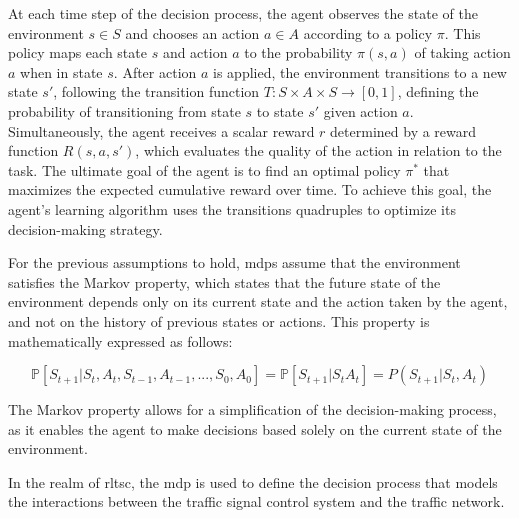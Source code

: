 At each time step of the decision process, the agent observes the state of the environment $s \in S$ and chooses an action $a \in A$ according to a policy $\pi$. This policy maps each state $s$ and action $a$ to the probability $\pi(s, a)$ of taking action $a$ when in state $s$. After action $a$ is applied, the environment transitions to a new state $s'$, following the transition function $T : S \times A \times S \rightarrow [0, 1]$, defining the probability of transitioning from state $s$ to state $s'$ given action $a$. Simultaneously, the agent receives a scalar reward $r$ determined by a reward function $R(s, a, s')$, which evaluates the quality of the action in relation to the task. The ultimate goal of the agent is to find an optimal policy $\pi^*$ that maximizes the expected cumulative reward over time. To achieve this goal, the agent's learning algorithm uses the transitions quadruples to optimize its decision-making strategy.

For the previous assumptions to hold, \glspl{mdp} assume that the environment satisfies the Markov property, which states that the future state of the environment depends only on its current state and the action taken by the agent, and not on the history of previous states or actions. This property is mathematically expressed as follows:

\begin{equation}\label{eq:markovprop}
  \mathbb{P}[S_{t+1} | S_t, A_t, S_{t-1}, A_{t-1}, ..., S_0, A_0] = \mathbb{P}[S_{t+1} | S_t A_t] = P(S_{t+1}|S_t, A_t)
\end{equation}

The Markov property allows for a simplification of the decision-making process, as it enables the agent to make decisions based solely on the current state of the environment.

\medskip

\noindent In the realm of \gls{rltsc}, the \gls{mdp} is used to define the decision process that models the interactions between the traffic signal control system and the traffic network.

